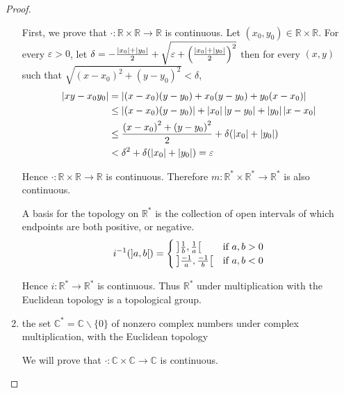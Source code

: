 \begin{proof}
\begin{enumerate}[label={(\alph*)}]
		      First, we prove that $\cdot: \mathbb{R}\times\mathbb{R}\to\mathbb{R}$ is continuous. Let $(x_{0}, y_{0})\in\mathbb{R}\times\mathbb{R}$. For every $\varepsilon > 0$, let $\delta = -\frac{\left\vert{x_{0}}\right\vert+\left\vert{y_{0}}\right\vert}{2} + \sqrt{\varepsilon + {\left(\frac{\left\vert{x_{0}}\right\vert+\left\vert{y_{0}}\right\vert}{2}\right)}^{2}}$ then for every $(x, y)$ such that $\sqrt{{(x - x_{0})}^{2} + {(y - y_{0})}^{2}} < \delta$,
		      \begin{align*}
			      \left\vert{xy - x_{0}y_{0}}\right\vert & = \left\vert{(x - x_{0})(y - y_{0}) + x_{0}(y - y_{0}) + y_{0}(x - x_{0})}\right\vert                        \\
			                            & \leq \left\vert{(x - x_{0})(y - y_{0})}\right\vert + \left\vert{x_{0}}\right\vert\left\vert{y - y_{0}}\right\vert + \left\vert{y_{0}}\right\vert\left\vert{x - x_{0}}\right\vert \\
			                            & \leq \frac{{(x - x_{0})}^{2} + {(y - y_{0})}^{2}}{2} + \delta(\left\vert{x_{0}}\right\vert + \left\vert{y_{0}}\right\vert)    \\
			                            & < \delta^{2} + \delta(\left\vert{x_{0}}\right\vert + \left\vert{y_{0}}\right\vert) = \varepsilon
		      \end{align*}

		      Hence $\cdot: \mathbb{R}\times\mathbb{R}\to \mathbb{R}$ is continuous. Therefore $m: \mathbb{R}^{*}\times\mathbb{R}^{*}\to \mathbb{R}^{*}$ is also continuous.

		      A basis for the topology on $\mathbb{R}^{*}$ is the collection of open intervals of which endpoints are both positive, or negative.
		      \[
			      i^{-1}(\left]{a, b}\right[) = \begin{cases}
				      \left]{\frac{1}{b}, \frac{1}{a}}\right[   & \text{if $a, b > 0$} \\
				      \left]{\frac{-1}{a}, \frac{-1}{b}}\right[ & \text{if $a, b < 0$}
			      \end{cases}
		      \]

		      Hence $i: \mathbb{R}^{*}\to \mathbb{R}^{*}$ is continuous. Thus $\mathbb{R}^{*}$ under multiplication with the Euclidean topology is a topological group.
		\item the set $\mathbb{C}^{*} = \mathbb{C}\smallsetminus\{0\}$ of nonzero complex numbers under complex multiplication, with the Euclidean topology

		      We will prove that $\cdot: \mathbb{C}\times\mathbb{C}\to\mathbb{C}$ is continuous.


\end{enumerate}
\end{proof}
